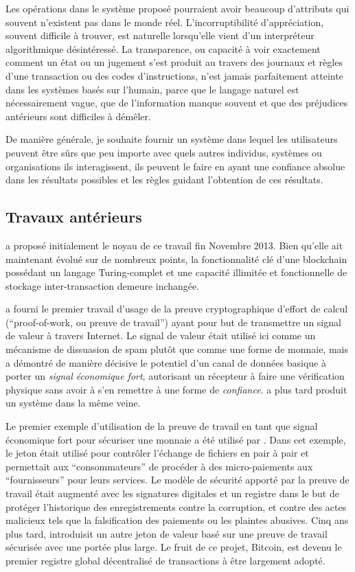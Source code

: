 \documentclass[9pt,oneside]{amsart}
\begin{document}
\begin{multicols}{2}
Les opérations dans le système proposé pourraient avoir beaucoup d'attributs qui souvent n'existent pas dans le monde réel. L'incorruptibilité d'appréciation, souvent difficile à trouver, est naturelle lorsqu'elle vient d'un interpréteur algorithmique désintéressé. La transparence, ou capacité à voir exactement comment un état ou un jugement s'est produit au travers des journaux et règles d'une transaction ou des codes d'instructions, n'est jamais parfaitement atteinte dans les systèmes basés sur l'humain, parce que le langage naturel est nécessairement vague, que de l'information manque souvent et que des préjudices antérieurs sont difficiles à démêler.

De manière générale, je souhaite fournir un système dans lequel les utilisateurs peuvent être sûrs que peu importe avec quels autres individus, systèmes ou organisations ils interagissent, ils peuvent le faire en ayant une confiance absolue dans les résultats possibles et les règles guidant l'obtention de ces résultats.

\subsection{Travaux antérieurs} \label{ch:previous}

\cite{buterin2013ethereum} a proposé initialement le noyau de ce travail fin Novembre 2013. Bien qu'elle ait maintenant évolué sur de nombreux points, la fonctionnalité clé d'une blockchain possédant un langage Turing-complet et une capacité illimitée et fonctionnelle de stockage inter-transaction demeure inchangée.

\cite{dwork92pricingvia} a fourni le premier travail d'usage de la preuve cryptographique d’effort de calcul (``proof-of-work, ou preuve de travail'') ayant pour but de transmettre un signal de valeur à travers Internet. Le signal de valeur était utilisé ici comme un mécanisme de dissuasion de spam plutôt que comme une forme de monnaie, mais a démontré de manière décisive le potentiel d'un canal de données basique à porter un \textit{signal économique fort}, autorisant un récepteur à faire une vérification physique sans avoir à s'en remettre à une forme de \textit{confiance}. \cite{back2002hashcash} a plus tard produit un système dans la même veine.

Le premier exemple d'utilisation de la preuve de travail en tant que signal économique fort pour sécuriser une monnaie a été utilisé par \cite{vishnumurthy03karma:a}. Dans cet exemple, le jeton était utilisé pour contrôler l'échange de fichiers en pair à pair et permettait aux ``consommateurs'' de procéder à des micro-paiements aux ``fournisseurs'' pour leurs services. Le modèle de sécurité apporté par la preuve de travail était augmenté avec les signatures digitales et un registre dans le but de protéger l'historique des enregistrements contre la corruption, et contre des actes malicieux tels que la falsification des paiements ou les plaintes abusives. Cinq ans plus tard, \cite{nakamoto2008bitcoin} introduisit un autre jeton de valeur basé sur une preuve de travail sécurisée avec une portée plus large. Le fruit de ce projet, Bitcoin, est devenu le premier registre global décentralisé de transactions à être largement adopté.


\end{multicols}
\end{document}
